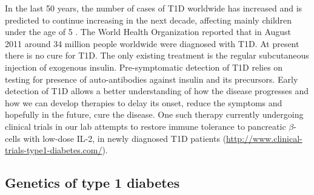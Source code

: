 In the last 50 years, the number of cases of T1D worldwide has increased and is predicted to continue increasing in the next decade,
affecting mainly children under the age of 5 \citep{Patterson:2009gj}.
The World Health Organization reported that in August 2011 around 34 million people worldwide were diagnosed with T1D.
At present there is no cure for \gls{T1D}.
The only existing treatment is the regular subcutaneous injection of exogenous insulin.  
Pre-symptomatic detection of T1D relies on testing for presence of auto-antibodies against insulin and its precursors.
Early detection of T1D allows a better understanding of how the disease progresses and how we can develop therapies to delay its onset,
reduce the symptoms and hopefully in the future, cure the disease.  
One such therapy currently undergoing clinical trials in our lab attempts to restore immune tolerance to pancreatic $\beta$-cells with low-dose \gls{IL-2},
in newly diagnosed \gls{T1D} patients (\url{http://www.clinical-trials-type1-diabetes.com/}).


\subsection{Genetics of type 1 diabetes}


